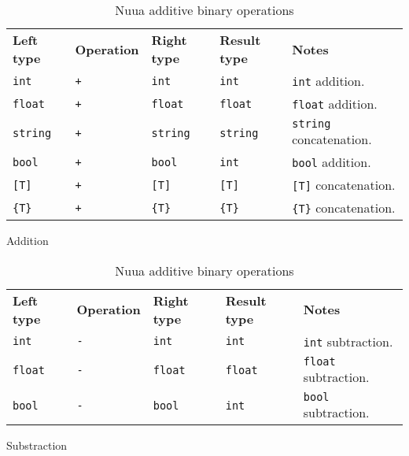 \begin{table}[H]
    \centering
    \begin{subtable}{\textwidth}
        \centering
        \begin{tabular}{ l l l l p{9.5cm} }
            \textbf{Left type} & \textbf{Operation} & \textbf{Right type} & \textbf{Result type} & \textbf{Notes} \\
            \texttt{int} & \texttt{+} & \texttt{int} & \texttt{int} & \texttt{int} addition.\\
            \texttt{float} & \texttt{+} & \texttt{float} & \texttt{float} & \texttt{float} addition.\\
            \texttt{string} & \texttt{+} & \texttt{string} & \texttt{string} & \texttt{string} concatenation.\\
            \texttt{bool} & \texttt{+} & \texttt{bool} & \texttt{int} & \texttt{bool} addition.\\
            \texttt{[T]} & \texttt{+} & \texttt{[T]} & \texttt{[T]} & \texttt{[T]} concatenation.\\
            \texttt{\{T\}} & \texttt{+} & \texttt{\{T\}} & \texttt{\{T\}} & \texttt{\{T\}} concatenation.\\
        \end{tabular}
        \caption{Addition}
    \end{subtable}
    \begin{subtable}{\textwidth}
        \centering
        \begin{tabular}{ l l l l p{9.5cm} }
            \textbf{Left type} & \textbf{Operation} & \textbf{Right type} & \textbf{Result type} & \textbf{Notes} \\
            \texttt{int} & \texttt{-} & \texttt{int} & \texttt{int} & \texttt{int} subtraction.\\
            \texttt{float} & \texttt{-} & \texttt{float} & \texttt{float} & \texttt{float} subtraction.\\
            \texttt{bool} & \texttt{-} & \texttt{bool} & \texttt{int} & \texttt{bool} subtraction.\\
        \end{tabular}
        \caption{Substraction}
    \end{subtable}
    \caption{Nuua additive binary operations}
    \label{fig:nuua_additive_bin_ops}
\end{table}

